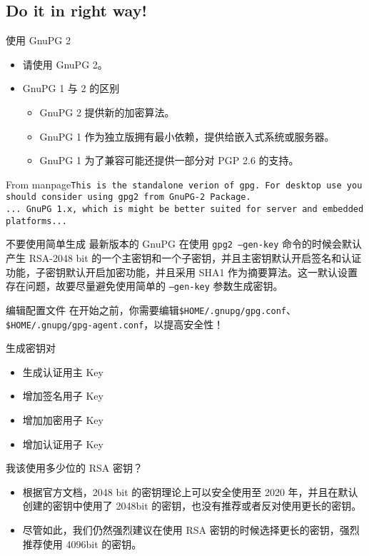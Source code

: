 \documentclass{beamer}
\begin{document}
		\subsection{Do it in right way!}
			\begin{frame}[fragile]{使用 GnuPG 2}
				\begin{itemize}[<+->]
					\item 请使用 GnuPG 2。
					\item GnuPG 1 与 2 的区别
					\begin{itemize}
						\item GnuPG 2 提供新的加密算法。
						\item GnuPG 1 作为独立版拥有最小依赖，提供给嵌入式系统或服务器。
						\item GnuPG 1 为了兼容可能还提供一部分对 PGP 2.6 的支持。 
					\end{itemize}
				\end{itemize}
				\begin{block}{From manpage}\texttt{This is the standalone verion of gpg. For desktop use you should consider using gpg2 from GnuPG-2 Package.}
					\\
					\texttt{... GnuPG 1.x, which is might be better suited for server and embedded platforms...}
				\end{block}
\end{frame}
		\begin{frame}{不要使用简单生成}
			最新版本的 GnuPG 在使用 \texttt{gpg2 --gen-key} 命令的时候会默认产生 RSA-2048 bit 的一个主密钥和一个子密钥，并且主密钥默认开启签名和认证功能，子密钥默认开启加密功能，并且采用 SHA1 作为摘要算法。这一默认设置存在问题，故要尽量避免使用简单的 \texttt{--gen-key} 参数生成密钥。
		\end{frame}
		\begin{frame}{编辑配置文件}
			在开始之前，你需要编辑\texttt{\$HOME/.gnupg/gpg.conf}、\texttt{\$HOME/.gnupg/gpg-agent.conf}，以提高安全性！
		\end{frame}
		\begin{frame}{生成密钥对}
			\begin{itemize}
				\item 生成认证用主 Key
				\item 增加签名用子 Key
				\item 增加加密用子 Key
				\item 增加认证用子 Key
			\end{itemize}
		\end{frame}
		\begin{frame}{我该使用多少位的 RSA 密钥？}
		\begin{itemize}
			\item 	根据官方文档，2048 bit 的密钥理论上可以安全使用至 2020 年，并且在默认创建的密钥中使用了 2048bit 的密钥，也没有推荐或者反对使用更长的密钥。
			\item 尽管如此，我们仍然强烈建议在使用 RSA 密钥的时候选择更长的密钥，强烈推荐使用 4096bit 的密钥。
		\end{itemize}
	\end{frame}
\end{document}
